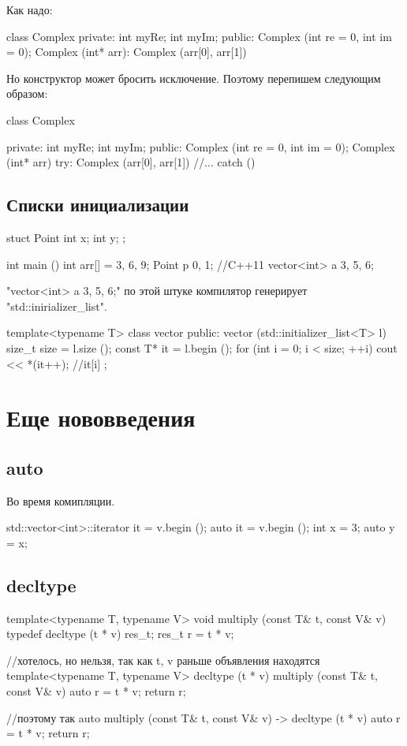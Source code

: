 Как надо:
\begin{cppcode}
class Complex {
private:
	int myRe;
	int myIm;
public:
	Complex (int re = 0, int im = 0);
	Complex (int* arr): Complex (arr[0], arr[1]) {}
}
\end{cppcode}
Но конструктор может бросить исключение.
Поэтому перепишем следующим образом:

\begin{cppcode}
class Complex {
private:
	int myRe;
	int myIm;
public:
	Complex (int re = 0, int im = 0);
	Complex (int* arr) try: Complex (arr[0], arr[1]) {
		//...
	}
	catch (){

	}
}
\end{cppcode}

\subsection{Списки инициализации}
\begin{cppcode}
stuct Point {
	int x; 
	int y;	
};

int main () {
	int arr[] = {3, 6, 9};
	Point p {0, 1};
	//C++11
	vector<int> a {3, 5, 6};
}
\end{cppcode}
\cpp"vector<int> a {3, 5, 6};" по этой штуке компилятор генерирует \cpp"std::inirializer_list".

\begin{cppcode}
template<typename T>
class vector {
public:
	vector (std::initializer_list<T> l) {
		size_t size = l.size ();
		const T* it = l.begin ();
		for (int i = 0; i < size; ++i)
			cout << *(it++); //it[i] 
	}	
};
\end{cppcode}






\section{Еще нововведения}

\subsection{auto}
Во время комипляции. 
\begin{cppcode}
std::vector<int>::iterator it = v.begin ();
auto it = v.begin ();
int x = 3;
auto y = x;
\end{cppcode}

\subsection{decltype}
\begin{cppcode}
template<typename T, typename V> 
void multiply (const T& t, const V& v) {
	typedef decltype (t * v) res_t;
	res_t r = t * v;
}

//хотелось, но нельзя, так как t, v раньше объявления находятся
template<typename T, typename V> 
decltype (t * v) multiply (const T& t, const V& v) {
	auto r = t * v;
	return r;
}

//поэтому так
auto multiply (const T& t, const V& v) -> decltype (t * v) {
	auto r = t * v;
	return r;
}
\end{cppcode}

